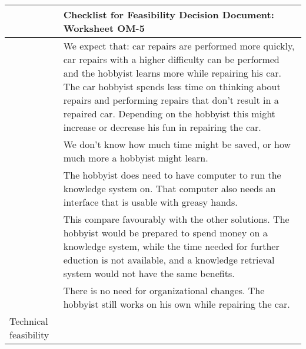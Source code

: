 \noindent
\begin{tabular}%
       {|>{\colleft}p{3cm}%
        |>{\colleft}p{10cm}|}
\hline
{\bf Organization Model} &
  {\bf Checklist for Feasibility Decision Document: Worksheet OM-5} \\
\hline
\hline
{\sc Business feasibility} &

We expect that: car repairs are performed more quickly, car repairs with a higher difficulty can
be performed and the hobbyist learns more while repairing his car. The car
hobbyist spends less time on thinking about repairs and performing repairs that
don't result in a repaired car. Depending on the hobbyist this might increase or
decrease his fun in repairing the car.
\\
&
We don't know how much time might be saved, or how much more a hobbyist might
learn. 
\\
& The hobbyist does need to have computer to run the knowledge system on. That
computer also needs an interface that is usable with greasy hands.\\
&
This compare favourably with the other solutions. The hobbyist would be prepared
to spend money on a knowledge system, while the time needed for further eduction
is not available, and a knowledge retrieval system would not have the same
benefits. \\
& There is no need for organizational changes. The hobbyist still works on his
own while repairing the car. \\
\hline
\sc Technical feasibility &

\end{tabular}
